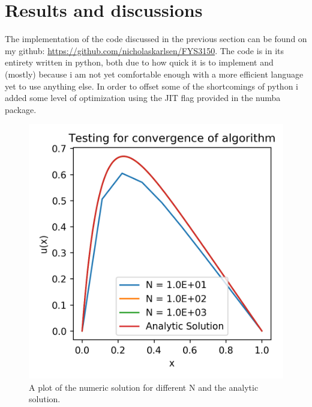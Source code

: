 \documentclass[10pt,showpacs,preprintnumbers,footinbib,amsmath,amssymb,aps,prl,twocolumn,groupedaddress,superscriptaddress,showkeys]{revtex4-1}
\begin{document}
\section{Results and discussions}
  The implementation of the code discussed in the previous section can be found on my github: \url{https://github.com/nicholaskarlsen/FYS3150}. The code is in its entirety written in python, both due to how quick it is to implement and (mostly) because i am not yet comfortable enough with a more efficient language yet to use anything else. In order to offset some of the shortcomings of python i added some level of optimization using the JIT flag provided in the numba package.

  \newpage


  \begin{figure}[h!]
    \center
    \includegraphics[scale=.7]{figs/ex1c_compare.png}
    \caption{A plot of the numeric solution for different N and the analytic solution.}
    \label{fig:compare}
  \end{figure}
\end{document}

